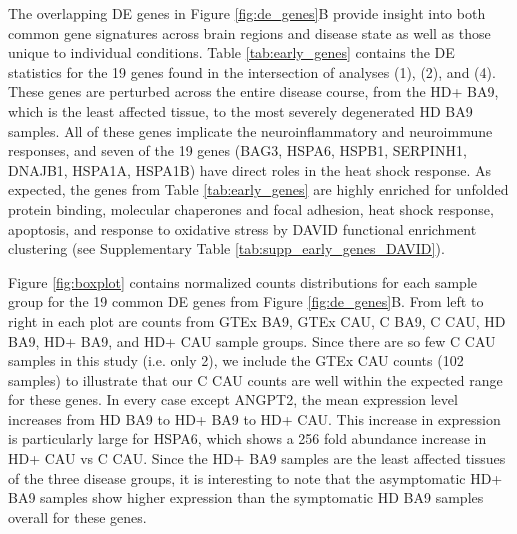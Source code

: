 \documentclass[fleqn,10pt,table]{wlscirep}
\begin{document}
The overlapping DE genes in Figure \ref{fig:de_genes}B provide insight into both common gene signatures across brain regions and disease state as well as those unique to individual conditions.
Table \ref{tab:early_genes} contains the DE statistics for the 19 genes found in the intersection of analyses (1), (2), and (4).
These genes are perturbed across the entire disease course, from the HD+ BA9, which is the least affected tissue, to the most severely degenerated HD BA9 samples.
All of these genes implicate the neuroinflammatory and neuroimmune responses, and seven of the 19 genes (BAG3, HSPA6, HSPB1, SERPINH1, DNAJB1, HSPA1A, HSPA1B) have direct roles in the heat shock response.
As expected, the genes from Table \ref{tab:early_genes} are highly enriched for unfolded protein binding, molecular chaperones and focal adhesion, heat shock response, apoptosis, and response to oxidative stress by DAVID functional enrichment clustering (see Supplementary Table \ref{tab:supp_early_genes_DAVID}).


Figure \ref{fig:boxplot} contains normalized counts distributions for each sample group for the 19 common DE genes from Figure \ref{fig:de_genes}B.
From left to right in each plot are counts from GTEx BA9, GTEx CAU, C BA9, C CAU, HD BA9, HD+ BA9, and HD+ CAU sample groups.
Since there are so few C CAU samples in this study (i.e. only 2), we include the GTEx CAU counts (102 samples) to illustrate that our C CAU counts are well within the expected range for these genes.
In every case except ANGPT2, the mean expression level increases from HD BA9 to HD+ BA9 to HD+ CAU.
This increase in expression is particularly large for HSPA6, which shows a 256 fold abundance increase in HD+ CAU vs C CAU.
Since the HD+ BA9 samples are the least affected tissues of the three disease groups, it is interesting to note that the asymptomatic HD+ BA9 samples show higher expression than the symptomatic HD BA9 samples overall for these genes.
\end{document}
